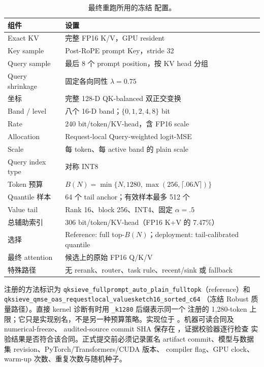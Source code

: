 \begin{table}[h]
\caption{最终重跑所用的冻结 \method 配置。}
\centering
\begin{tabular}{ll}
\toprule
组件 & 设置 \\
\midrule
Exact KV & 完整 FP16 K/V，GPU resident \\
Key sample & Post-RoPE prompt Key，stride 32 \\
Query sample & 最后 8 个 prompt position，按 KV head 分组 \\
Query shrinkage & 固定各向同性 $\lambda=0.75$ \\
坐标 & 完整 128-D QK-balanced 双正交变换 \\
Band / level & 八个 16-D band；$\{0,1,2,4,8\}$ bit \\
Rate & 240 bit/token/KV-head，含 FP16 scale \\
Allocation & Request-local Query-weighted logit-MSE \\
Scale & 每 token、每 active band 的 plain scale \\
Query index type & 对称 INT8 \\
Token 预算 & $B(N)=\min\{N,1280,\max(256,\lceil.06N\rceil)\}$ \\
Quantile 样本 & 64 个 tail anchor；有效样本最多 512 个 \\
Value tail & Rank 16、block 256、INT4、固定 $\alpha=.5$ \\
总辅助索引 & 306 bit/token/KV-head（FP16 K+V 的 7.47\%） \\
选择 & Reference: full top-$B(N)$；deployment: tail-calibrated quantile \\
最终 attention & 候选上的原始 FP16 Q/K/V \\
特殊路径 & 无 rerank、router、task rule、recent/sink 或 fallback \\
\bottomrule
\end{tabular}
\end{table}

注册的方法标识为
\texttt{qksieve\_fullprompt\_auto\_plain\_fulltopk}（reference）和
\texttt{qksieve\_qmse\_oas\_requestlocal\_valuesketch16\_sorted\_c64}
（冻结 Robust 质量路径）。直接 kernel 诊断有时用 \texttt{\_k1280} 后缀表示同一个
注册的 1,280-token 上限；它只是实现别名，不是另一种预算策略。实现位于
。机器可读合同及 numerical-freeze、
audited-source commit SHA 保存在
，证据校验器逐行检查
实验结果是否符合该合同。正式提交前必须记录匿名
artifact commit、模型与数据集 revision、PyTorch/Transformers/CUDA 版本、
compiler flag、GPU clock、warm-up 次数、重复次数与随机种子。

